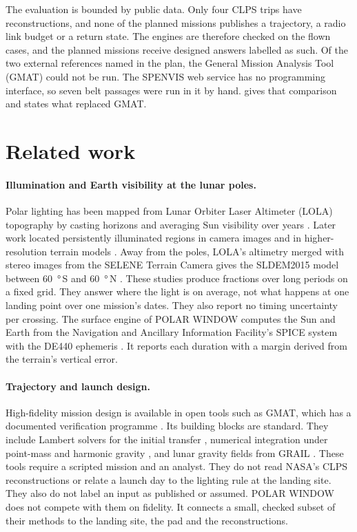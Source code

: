 \documentclass[11pt,a4paper]{article}
\begin{document}
The evaluation is bounded by public data. Only four CLPS trips have reconstructions,
and none of the planned missions publishes a trajectory, a radio link budget or a
return state. The engines are therefore checked on the flown cases, and the planned
missions receive designed answers labelled as such. Of the two external references named in
the plan, the General Mission Analysis Tool (GMAT) could not be run. The SPENVIS web service has
no programming interface, so seven belt passages were run in it by hand.  gives
that comparison and states what replaced GMAT.

\section{Related work}
\label{sec:related}

\paragraph{Illumination and Earth visibility at the lunar poles.} Polar lighting has been
mapped from Lunar Orbiter Laser Altimeter (LOLA) topography \citep{smith2010} by casting
horizons and averaging Sun visibility over years \citep{mazarico2011}. Later work located
persistently illuminated regions in camera images \citep{speyerer2013} and in
higher-resolution terrain models \citep{glaser2014}. Away from the poles, LOLA's altimetry merged with stereo
images from the SELENE Terrain Camera gives the SLDEM2015 model between \qty{60}{\degree}\,S and
\qty{60}{\degree}\,N \citep{barker2016}. These studies produce fractions over
long periods on a fixed grid. They answer where the light is on average, not what
happens at one landing point over one mission's dates. They also report no timing
uncertainty per crossing. The surface engine of POLAR WINDOW computes the Sun and Earth
from the Navigation and Ancillary Information Facility's SPICE system
\citep{acton1996,acton2018} with the DE440 ephemeris \citep{park2021}. It reports
each duration with a margin derived from the terrain's vertical error.

\paragraph{Trajectory and launch design.} High-fidelity mission design is available in
open tools such as GMAT, which has a documented verification programme
\citep{hughes2014}. Its building blocks are standard. They include Lambert solvers for the initial
transfer \citep{izzo2015}, numerical integration under point-mass and harmonic gravity
\citep{montenbruck2000}, and lunar gravity fields from GRAIL \citep{zuber2013}. These
tools require a scripted mission and an analyst. They do not read NASA's CLPS reconstructions or relate a launch day to the lighting rule at the landing site. They also do not label an input as published or assumed. POLAR WINDOW does not
compete with them on fidelity. It connects a small, checked subset of their methods to
the landing site, the pad and the reconstructions.
\end{document}
